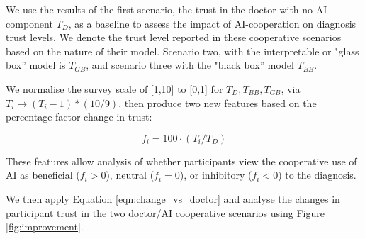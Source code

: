 \documentclass[manuscript,screen,review]{acmart}
\begin{document}
We use the results of the first scenario, the trust in the doctor with no AI component $T_D$, as a baseline to assess the impact of AI-cooperation on diagnosis trust levels. We denote the trust level reported in these cooperative scenarios based on the nature of their model. Scenario two, with the interpretable or "glass box'' model is $T_{GB}$, and scenario three with the "black box'' model $T_{BB}$.

We normalise the survey scale of [1,10] to [0,1] for $T_D, T_{BB}, T_{GB}$, via $T_i \rightarrow (T_i - 1) * (10/9)$, then produce two new features based on the percentage factor change in trust:

\begin{equation} \label{eqn:change_vs_doctor}
    f_i = 100 \cdot (T_i / T_D)
\end{equation}

These features allow analysis of whether participants view the cooperative use of AI as beneficial ($f_i > 0$), neutral ($f_i = 0$), or inhibitory ($f_i < 0$) to the diagnosis. 






We then apply Equation \ref{eqn:change_vs_doctor} and analyse the changes in participant trust in the two doctor/AI cooperative scenarios using Figure \ref{fig:improvement}.
\end{document}
